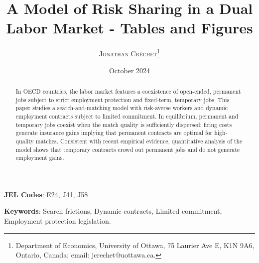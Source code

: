 \documentclass[12pt,letterpaper]{article} %
\author{ \textsc{Jonathan Créchet}\thanks{Department of Economics, University of Ottawa, 75 Laurier Ave E, K1N 9A6, Ontario, Canada; email: jcrechet@uottawa.ca.} }
\title{A Model of Risk Sharing in a Dual Labor Market - Tables and Figures}
\date{October 2024}
\theoremstyle{plain}
\theoremstyle{definition}
\begin{document}
	
	\maketitle

	\begin{abstract}
		In OECD countries, the labor market features a coexistence of open-ended, permanent jobs subject to strict employment protection and fixed-term, temporary jobs. This paper studies a search-and-matching model with risk-averse workers and dynamic employment contracts subject to limited commitment. In equilibrium, permanent and temporary jobs coexist when the match quality is sufficiently dispersed: firing costs generate insurance gains implying that permanent contracts are optimal for high-quality matches. Consistent with recent empirical evidence, quantitative analysis of the model shows that temporary contracts crowd out permanent jobs and do not generate employment gains.
	\end{abstract}
	
	\noindent \textbf{JEL Codes}: E24, J41, J58
	
	\smallskip
	
	\noindent \textbf{Keywords}: Search frictions, Dynamic contracts, Limited commitment, Employment protection legislation.
	
	\newpage
	
	
	
	
	
	
	
	
	
	
	
	
	
	
		
\end{document}
